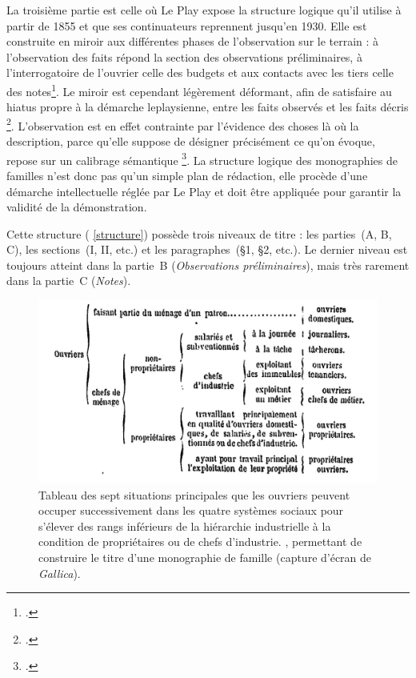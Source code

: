 La troisième partie est celle où Le Play expose la structure logique qu'il utilise à partir de 1855 et que ses continuateurs reprennent jusqu'en 1930.
Elle est construite en miroir aux différentes phases de l'observation sur le terrain : à l'observation des faits répond la section des observations préliminaires, à l'interrogatoire de l'ouvrier celle des budgets et aux contacts avec les tiers celle des notes\footcite[III., \og Précis des faits à observer --- Établissement des budgets \fg{}, p. 20-31]{instruction62}. Le miroir est cependant légèrement déformant, afin de satisfaire au \og hiatus \fg{} propre à la démarche leplaysienne, entre les \og faits observés \fg{} et les \og faits décris \fg\footcite[p. 87]{baciocchi2}. L'observation est en effet \og contrainte par l'évidence des choses \fg{} là où la description, \og parce qu'elle suppose de désigner précisément ce qu'on évoque, repose sur un calibrage sémantique \fg{}\footcite[p. 87-88]{baciocchi2}. La structure logique des monographies de familles n'est donc pas qu'un simple plan de rédaction, elle procède d'une démarche intellectuelle réglée par Le Play et doit être appliquée pour garantir la validité de la démonstration.

Cette structure (\ann{} \ref{structure}) possède trois niveaux de titre : les parties~(A, B, C), les sections~(I, II, etc.) et les paragraphes~(§1, §2, etc.). Le dernier niveau est toujours atteint dans la partie~B (\textit{Observations préliminaires}), mais très rarement dans la partie~C (\textit{Notes}).

\begin{figure}[h]
    \centering
    \includegraphics{img/tabl_titres.jpg}
    \caption{\og Tableau des sept situations principales que les ouvriers peuvent occuper successivement dans les quatre systèmes sociaux pour s'élever des rangs inférieurs de la hiérarchie industrielle à la condition de propriétaires ou de chefs d'industrie. \fg{}, permettant de construire le titre d'une monographie de famille (capture d'écran de \textit{Gallica}).}
    \label{tabletitre}
\end{figure}

